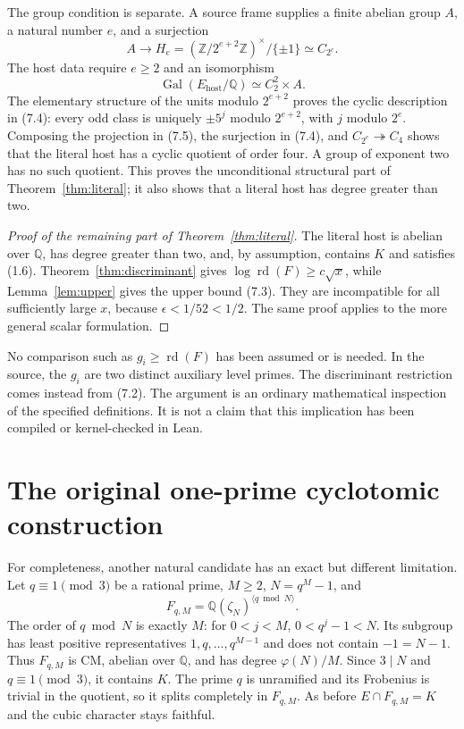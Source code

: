 \documentclass[11pt]{article}
\theoremstyle{remark}\newtheorem{remark}[theorem]{Remark}
\newcommand{\Q}{\mathbb Q}
\newcommand{\Z}{\mathbb Z}
\newcommand{\Gal}{\operatorname{Gal}}
\newcommand{\rd}{\operatorname{rd}}
\begin{document}
The group condition is separate. A source frame supplies a finite
abelian group $A$, a natural number $e$, and a surjection
\[
 A\longrightarrow
 H_e=(\Z/2^{e+2}\Z)^\times/\{\pm1\}\simeq C_{2^e}.
                                                        \tag{7.4}
\]
The host data require $e\ge2$ and an isomorphism
\[
            \Gal(E_{\mathrm{host}}/\Q)\simeq C_2^2\times A.
                                                        \tag{7.5}
\]
The elementary structure of the units modulo $2^{e+2}$ proves
the cyclic description in (7.4): every odd class is uniquely
$\pm5^j$ modulo $2^{e+2}$, with $j$ modulo $2^e$.
Composing the projection in (7.5), the surjection in (7.4), and
$C_{2^e}\twoheadrightarrow C_4$ shows that the literal host has
a cyclic quotient of order four. A group of exponent two has
no such quotient. This proves the unconditional structural part
of Theorem~\ref{thm:literal}; it also shows that a literal host
has degree greater than two.

\begin{proof}[Proof of the remaining part of Theorem~\ref{thm:literal}]
The literal host is abelian over $\Q$, has degree greater than
two, and, by assumption, contains $K$ and satisfies (1.6).
Theorem~\ref{thm:discriminant} gives
$\log\rd(F)\ge c\sqrt{x}$, while Lemma~\ref{lem:upper} gives
the upper bound (7.3). They are incompatible for all sufficiently
large $x$, because $\epsilon<1/52<1/2$.
The same proof applies to the more general scalar formulation.
\end{proof}

No comparison such as $g_i\ge\rd(F)$ has been assumed or is
needed. In the source, the $g_i$ are two distinct auxiliary level
primes. The discriminant restriction comes instead from (7.2).
The argument is an ordinary mathematical inspection of the
specified definitions. It is not a claim that this implication
has been compiled or kernel-checked in Lean.

\section{The original one-prime cyclotomic construction}

For completeness, another natural candidate has an exact but
different limitation. Let $q\equiv1\pmod3$ be a rational prime,
$M\ge2$, $N=q^M-1$, and
\[
             F_{q,M}=\Q(\zeta_N)^{\langle q\bmod N\rangle}.
                                                        \tag{8.1}
\]
The order of $q\bmod N$ is exactly $M$: for $0<j<M$,
$0<q^j-1<N$. Its subgroup has least positive representatives
$1,q,\ldots,q^{M-1}$ and does not contain $-1=N-1$.
Thus $F_{q,M}$ is CM, abelian over $\Q$, and has degree
$\varphi(N)/M$. Since $3\mid N$ and $q\equiv1\pmod3$, it
contains $K$. The prime $q$ is unramified and its Frobenius is
trivial in the quotient, so it splits completely in $F_{q,M}$.
As before $E\cap F_{q,M}=K$ and the cubic character stays faithful.
\end{document}
